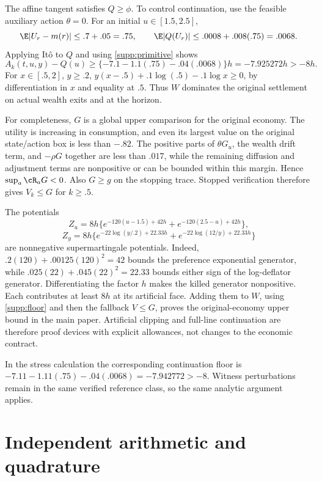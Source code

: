 The affine tangent satisfies $Q\geq\phi$. To control continuation, use the feasible auxiliary action $\theta=0$. For an initial $u\in[1.5,2.5]$,
\[
 \E|U_r-m(r)|\leq.7+.05=.75,\qquad
 \E|Q(U_r)|\leq.0008+.008(.75)=.0068.
\]
Applying It\^o to $Q$ and using \eqref{supp:primitive} shows
\begin{equation}
 A_k(t,u,y)-Q(u)\geq
 \{-7.1-1.1(.75)-.04(.0068)\}h=-7.925272h>-8h.
 \label{supp:floor}
\end{equation}
For $x\in[.5,2]$, $y\geq.2$,
$y(x-.5)+.1\log(.5)-.1\log x\geq0$, by differentiation in $x$ and equality at $.5$. Thus $W$ dominates the original settlement on actual wealth exits and at the horizon.

For completeness, $G$ is a global upper comparison for the original economy. The utility is increasing in consumption, and even its largest value on the original state/action box is less than $-.82$. The positive parts of $\theta G_u$, the wealth drift term, and $-\rho G$ together are less than $.017$, while the remaining diffusion and adjustment terms are nonpositive or can be bounded within this margin. Hence $\sup_a\cR_aG<0$. Also $G\geq g$ on the stopping trace. Stopped verification therefore gives $V_k\leq G$ for $k\geq.5$.

The potentials
\[
 Z_u=8h\{e^{-120(u-1.5)+42h}+e^{-120(2.5-u)+42h}\},
\]
\[
 Z_y=8h\{e^{-22\log(y/.2)+22.33h}+e^{-22\log(12/y)+22.33h}\}
\]
are nonnegative supermartingale potentials. Indeed, $.2(120)+.00125(120)^2=42$ bounds the preference exponential generator, while $.025(22)+.045(22)^2=22.33$ bounds either sign of the log-deflator generator. Differentiating the factor $h$ makes the killed generator nonpositive. Each contributes at least $8h$ at its artificial face. Adding them to $W$, using \eqref{supp:floor} and then the fallback $V\leq G$, proves the original-economy upper bound in the main paper. Artificial clipping and full-line continuation are therefore proof devices with explicit allowances, not changes to the economic contract.

In the stress calculation the corresponding continuation floor is
$-7.11-1.11(.75)-.04(.0068)=-7.942772>-8$. Witness perturbations remain in the same verified reference class, so the same analytic argument applies.

\section{Independent arithmetic and quadrature}\label{supp:arithmetic}
